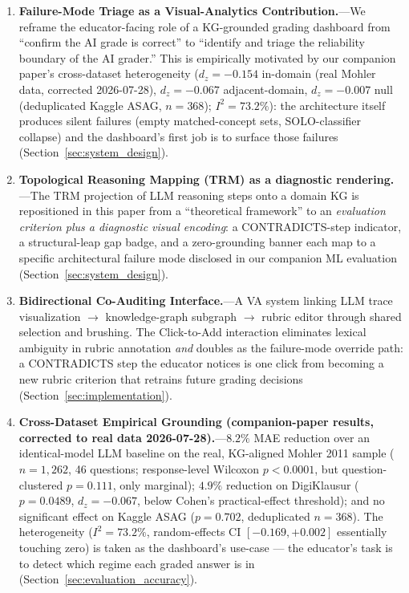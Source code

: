 \documentclass[journal,review]{vgtc}
\begin{document}
\begin{enumerate}
  \item \textbf{Failure-Mode Triage as a Visual-Analytics Contribution.}---We
  reframe the educator-facing role of a KG-grounded grading dashboard from
  ``confirm the AI grade is correct'' to ``identify and triage the
  reliability boundary of the AI grader.'' This is empirically motivated
  by our companion paper's cross-dataset heterogeneity ($d_z = -0.154$
  in-domain (real Mohler data, corrected 2026-07-28), $d_z = -0.067$ adjacent-domain,
  $d_z = -0.007$ null (deduplicated
  Kaggle ASAG, $n=368$);
  $I^2 = 73.2\%$): the architecture itself produces silent failures
  (empty matched-concept sets, SOLO-classifier collapse) and the
  dashboard's first job is to surface those failures
  (Section~\ref{sec:system_design}).

  \item \textbf{Topological Reasoning Mapping (TRM) as a diagnostic
  rendering.}---The TRM projection of LLM reasoning steps onto a domain
  KG is repositioned in this paper from a ``theoretical framework'' to
  an \emph{evaluation criterion plus a diagnostic visual encoding}: a
  CONTRADICTS-step indicator, a structural-leap gap badge, and a
  zero-grounding banner each map to a specific architectural failure
  mode disclosed in our companion ML evaluation
  (Section~\ref{sec:system_design}).

  \item \textbf{Bidirectional Co-Auditing Interface.}---A VA system
  linking LLM trace visualization $\to$ knowledge-graph subgraph $\to$
  rubric editor through shared selection and brushing. The
  Click-to-Add interaction eliminates lexical ambiguity in rubric
  annotation \emph{and} doubles as the failure-mode override path: a
  CONTRADICTS step the educator notices is one click from becoming a
  new rubric criterion that retrains future grading decisions
  (Section~\ref{sec:implementation}).

  \item \textbf{Cross-Dataset Empirical Grounding (companion-paper
  results, corrected to real data 2026-07-28).}---$8.2\%$ MAE reduction over an identical-model LLM
  baseline on the real, KG-aligned Mohler 2011 sample ($n = 1{,}262$, 46 questions;
  response-level Wilcoxon $p<0.0001$, but question-clustered $p=0.111$,
  only marginal); $4.9\%$
  reduction on DigiKlausur ($p = 0.0489$, $d_z = -0.067$, below
  Cohen's practical-effect threshold); and no significant effect on
  Kaggle ASAG ($p = 0.702$, deduplicated $n=368$). The heterogeneity ($I^2 = 73.2\%$, random-effects
  CI $[-0.169, +0.002]$ essentially touching zero) is taken as the dashboard's
  use-case --- the educator's task is to detect which regime each
  graded answer is in (Section~\ref{sec:evaluation_accuracy}).


\end{enumerate}
\end{document}
